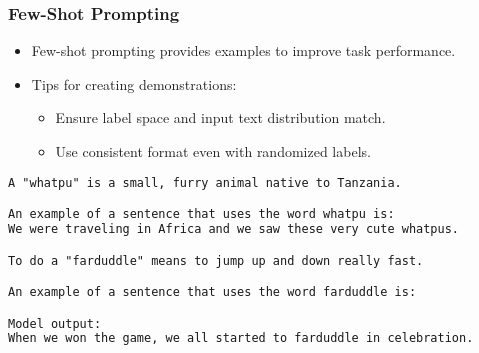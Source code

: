 

\begin{frame}[fragile]\frametitle{Few-Shot Prompting}
    \begin{itemize}
        \item Few-shot prompting provides examples to improve task performance.
        \item Tips for creating demonstrations:
        \begin{itemize}
            \item Ensure label space and input text distribution match.
            \item Use consistent format even with randomized labels.
        \end{itemize}
    \end{itemize}
	
        \begin{lstlisting}[language=HTML]
A "whatpu" is a small, furry animal native to Tanzania. 

An example of a sentence that uses the word whatpu is:
We were traveling in Africa and we saw these very cute whatpus.

To do a "farduddle" means to jump up and down really fast. 

An example of a sentence that uses the word farduddle is:

Model output:
When we won the game, we all started to farduddle in celebration.
        \end{lstlisting}

\end{frame}






